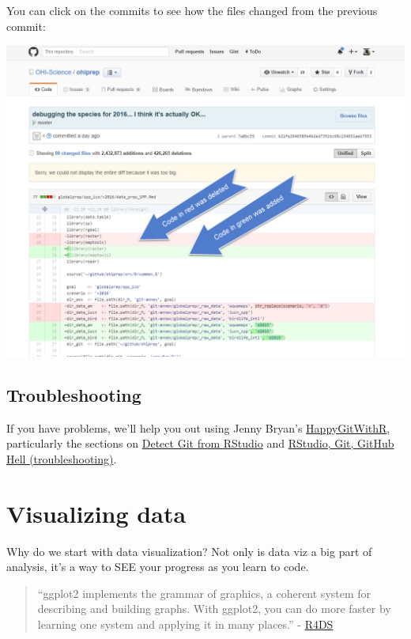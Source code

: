 \documentclass[]{book}
\theoremstyle{definition}
\theoremstyle{definition}
\theoremstyle{definition}
\theoremstyle{remark}
\begin{document}
You can click on the commits to see how the files changed from the
previous commit:

\includegraphics{img/commit_compare_3.png}

\section{Troubleshooting}\label{troubleshooting-1}

If you have problems, we'll help you out using Jenny Bryan's
\href{http://happygitwithr.com}{HappyGitWithR}, particularly the
sections on \href{http://happygitwithr.com/rstudio-see-git.html}{Detect
Git from RStudio} and
\href{http://happygitwithr.com/troubleshooting.html}{RStudio, Git,
GitHub Hell (troubleshooting)}.

\hypertarget{viz}{\chapter{Visualizing data}\label{viz}}

Why do we start with data visualization? Not only is data viz a big part
of analysis, it's a way to SEE your progress as you learn to code.

\begin{quote}
``ggplot2 implements the grammar of graphics, a coherent system for
describing and building graphs. With ggplot2, you can do more faster by
learning one system and applying it in many places.'' -
\href{http://r4ds.had.co.nz/data-visualisation.html}{R4DS}
\end{quote}
\end{document}
